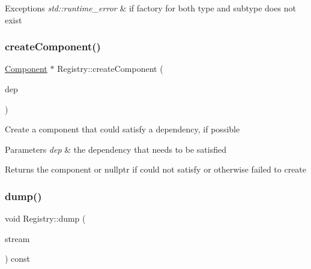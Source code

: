 \begin{DoxyExceptions}{Exceptions}
{\em std\+::runtime\+\_\+error} & if factory for both type and subtype does not exist \\
\hline
\end{DoxyExceptions}
\mbox{\label{classtheoria_1_1core_1_1Registry_aab152e6e19be2b33f13bb82e77aca917}} 
\subsubsection{\texorpdfstring{create\+Component()}{createComponent()}\hspace{0.1cm}{\footnotesize\ttfamily [3/3]}}
{\footnotesize\ttfamily \hyperlink{classtheoria_1_1core_1_1Component}{Component} $\ast$ Registry\+::create\+Component (\begin{DoxyParamCaption}\item[{const \hyperlink{structtheoria_1_1core_1_1Dependencies_1_1Dependent}{Dependencies\+::\+Dependent} \&}]{dep }\end{DoxyParamCaption})\hspace{0.3cm}{\ttfamily [noexcept]}}

Create a component that could satisfy a dependency, if possible


\begin{DoxyParams}{Parameters}
{\em dep} & the dependency that needs to be satisfied \\
\hline
\end{DoxyParams}
\begin{DoxyReturn}{Returns}
the component or nullptr if could not satisfy or otherwise failed to create 
\end{DoxyReturn}
\mbox{\label{classtheoria_1_1core_1_1Registry_a1c4d191d20916e4821bee32680a804e6}} 
\subsubsection{\texorpdfstring{dump()}{dump()}}
{\footnotesize\ttfamily void Registry\+::dump (\begin{DoxyParamCaption}\item[{std\+::ostream \&}]{stream }\end{DoxyParamCaption}) const}

